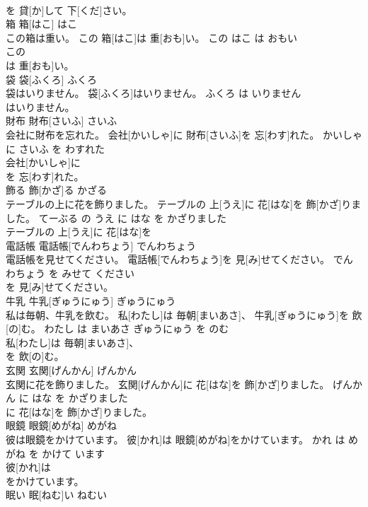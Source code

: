 \documentclass[8pt]{extreport}
\begin{document}
\begin{CJK}{UTF8}{min}
\\	を 貸[か]して 下[くだ]さい。			
\\	箱	箱[はこ]	はこ	
\\	この箱は重い。	この 箱[はこ]は 重[おも]い。	この はこ は おもい	
\\	この
\\	は 重[おも]い。			
\\	袋	袋[ふくろ]	ふくろ	
\\	袋はいりません。	袋[ふくろ]はいりません。	ふくろ は いりません	
\\	はいりません。			
\\	財布	財布[さいふ]	さいふ	
\\	会社に財布を忘れた。	会社[かいしゃ]に 財布[さいふ]を 忘[わす]れた。	かいしゃ に さいふ を わすれた	
\\	会社[かいしゃ]に
\\	を 忘[わす]れた。			
\\	飾る	飾[かざ]る	かざる	
\\	テーブルの上に花を飾りました。	テーブルの 上[うえ]に 花[はな]を 飾[かざ]りました。	てーぶる の うえ に はな を かざりました	
\\	テーブルの 上[うえ]に 花[はな]を
\\	電話帳	電話帳[でんわちょう]	でんわちょう	
\\	電話帳を見せてください。	電話帳[でんわちょう]を 見[み]せてください。	でんわちょう を みせて ください	
\\	を 見[み]せてください。			
\\	牛乳	牛乳[ぎゅうにゅう]	ぎゅうにゅう	
\\	私は毎朝、牛乳を飲む。	私[わたし]は 毎朝[まいあさ]、 牛乳[ぎゅうにゅう]を 飲[の]む。	わたし は まいあさ ぎゅうにゅう を のむ	
\\	私[わたし]は 毎朝[まいあさ]、
\\	を 飲[の]む。			
\\	玄関	玄関[げんかん]	げんかん	
\\	玄関に花を飾りました。	玄関[げんかん]に 花[はな]を 飾[かざ]りました。	げんかん に はな を かざりました	
\\	に 花[はな]を 飾[かざ]りました。			
\\	眼鏡	眼鏡[めがね]	めがね	
\\	彼は眼鏡をかけています。	彼[かれ]は 眼鏡[めがね]をかけています。	かれ は めがね を かけて います	
\\	彼[かれ]は
\\	をかけています。			
\\	眠い	眠[ねむ]い	ねむい	

\end{CJK}
\end{document}
